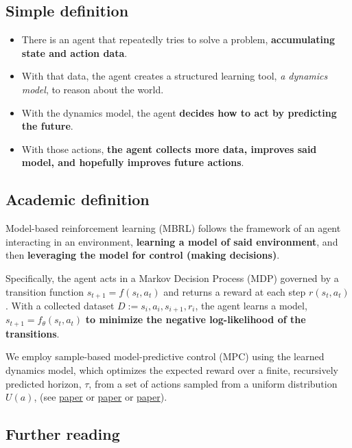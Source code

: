 \documentclass[11pt,a4paper]{article}
\begin{document}
\subsection{Simple definition}\label{simple-definition}

\begin{itemize}
\item
  There is an agent that repeatedly tries to solve a problem, \textbf{accumulating state and action data}.
\item
  With that data, the agent creates a structured learning tool, \emph{a dynamics model}, to reason about the world.
\item
  With the dynamics model, the agent \textbf{decides how to act by predicting the future}.
\item
  With those actions, \textbf{the agent collects more data, improves said model, and hopefully improves future actions}.
\end{itemize}

\subsection{Academic definition}\label{academic-definition}

Model-based reinforcement learning (MBRL) follows the framework of an agent interacting in an environment, \textbf{learning a model of said environment}, and then \textbf{leveraging the model for control (making decisions)}.

Specifically, the agent acts in a Markov Decision Process (MDP) governed by a transition function \(s_{t+1} = f (s_t , a_t)\) and returns a reward at each step \(r(s_t, a_t)\). With a collected dataset \(D :={ s_i, a_i, s_{i+1}, r_i}\), the agent learns a model, \(s_{t+1} = f_\theta (s_t , a_t)\) \textbf{to minimize the negative log-likelihood of the transitions}.

We employ sample-based model-predictive control (MPC) using the learned dynamics model, which optimizes the expected reward over a finite, recursively predicted horizon, \(\tau\), from a set of actions sampled from a uniform distribution \(U(a)\), (see \href{https://arxiv.org/pdf/2002.04523}{paper} or \href{https://arxiv.org/pdf/2012.09156.pdf}{paper} or \href{https://arxiv.org/pdf/2009.01221.pdf}{paper}).

\subsection{Further reading}\label{further-reading-1}
\end{document}
